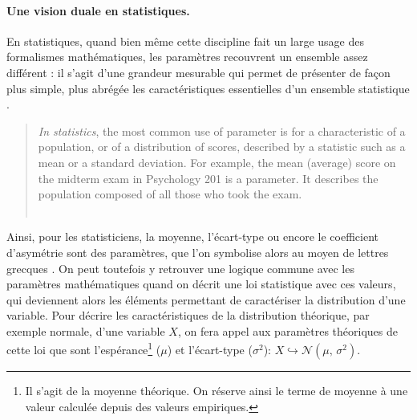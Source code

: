 \paragraph{Une vision duale en statistiques.}

En statistiques, quand bien même cette discipline fait un large usage des formalismes mathématiques, les paramètres recouvrent un ensemble assez différent :
	il s'agit d'une \og grandeur mesurable qui permet de présenter de façon plus simple, plus abrégée les caractéristiques essentielles d'un ensemble statistique\fg{} \autocite[Paramètre, \textsc{stat.} (calcul des probabilités)]{tresor1992}.
\begin{quotation}
	\noindent \og \textit{In statistics}, the most common use of \og parameter\fg{} is for a characteristic of a population, or of a distribution of scores, described by a statistic such as a mean or a standard deviation.
	For example, the mean (average) score on the midterm exam in Psychology 201 is a parameter.
	It describes the population composed of all those who took the exam.\fg{}\\
	\mbox{}~ \hfill \autocite[164]{vogt1993dictionary}
\end{quotation}
Ainsi, pour les statisticiens, la moyenne, l'écart-type ou encore le coefficient d'asymétrie sont des paramètres, que l'on symbolise alors au moyen de lettres grecques \autocite[ibid.]{vogt1993dictionary}.
On peut toutefois y retrouver une logique commune avec les paramètres mathématiques quand on décrit une loi statistique avec ces valeurs, qui deviennent alors les éléments permettant de caractériser la distribution d'une variable.
Pour décrire les caractéristiques de la distribution théorique, par exemple normale, d'une variable $X$, on fera appel aux paramètres théoriques de cette loi que sont l'espérance\footnote{
	Il s'agit de la moyenne théorique.
	On réserve ainsi le terme de moyenne à une valeur calculée depuis des valeurs empiriques.
} ($\mu$) et l'écart-type ($\sigma^{2}$): $X \hookrightarrow  \mathcal{N}(\mu,\,\sigma^{2})$.

